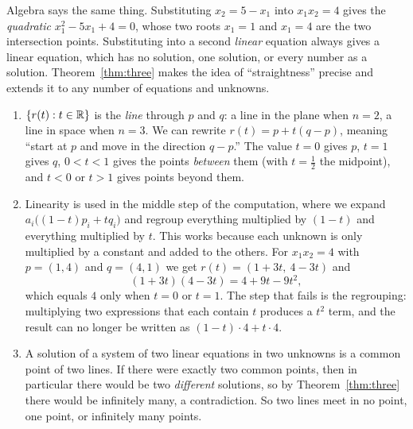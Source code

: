 \documentclass[11pt]{article}
\begin{document}
\begin{description}[leftmargin=0pt,itemsep=5pt]
        Algebra says the same thing. Substituting $x_2=5-x_1$ into $x_1x_2=4$ gives the
        \emph{quadratic} $x_1^2-5x_1+4=0$, whose two roots $x_1=1$ and $x_1=4$ are the two
        intersection points. Substituting into a second \emph{linear} equation always gives a linear
        equation, which has no solution, one solution, or every number as a solution. Theorem~\ref{thm:three}
        makes the idea of ``straightness'' precise and extends it to any number of equations and
        unknowns.
  \item[Pause and think \ref{think:proof}.]
        \begin{enumerate}[label=(\arabic*),nosep,leftmargin=*]
          \item $\{r(t):t\in\mathbb{R}\}$ is the \emph{line} through $p$ and $q$: a line in the plane when
                $n=2$, a line in space when $n=3$. We can rewrite $r(t)=p+t(q-p)$, meaning ``start at
                $p$ and move in the direction $q-p$.'' The value $t=0$ gives $p$, $t=1$ gives $q$,
                $0<t<1$ gives the points \emph{between} them (with $t=\tfrac12$ the midpoint), and
                $t<0$ or $t>1$ gives points beyond them.
          \item Linearity is used in the middle step of the computation, where we expand
                $a_i\bigl((1-t)p_i+tq_i\bigr)$ and regroup everything multiplied by $(1-t)$ and
                everything multiplied by $t$. This works because each unknown is only multiplied by
                a constant and added to the others. For $x_1x_2=4$ with $p=(1,4)$ and $q=(4,1)$ we get
                $r(t)=(1+3t,\ 4-3t)$ and
                \[(1+3t)(4-3t)=4+9t-9t^2,\]
                which equals $4$ only when $t=0$ or $t=1$. The step that fails is the regrouping:
                multiplying two expressions that each contain $t$ produces a $t^2$ term, and the result
                can no longer be written as $(1-t)\cdot4+t\cdot4$.
          \item A solution of a system of two linear equations in two unknowns is a common point of two
                lines. If there were exactly two common points, then in particular there would be two
                \emph{different} solutions, so by Theorem~\ref{thm:three} there would be infinitely many,
                a contradiction. So two lines meet in no point, one point, or infinitely many points.
        \end{enumerate}
  \item[Pause and think \ref{think:rowops}.]
        \begin{enumerate}[label=(\arabic*),nosep,leftmargin=*]

\end{enumerate}
\end{description}
\end{document}

